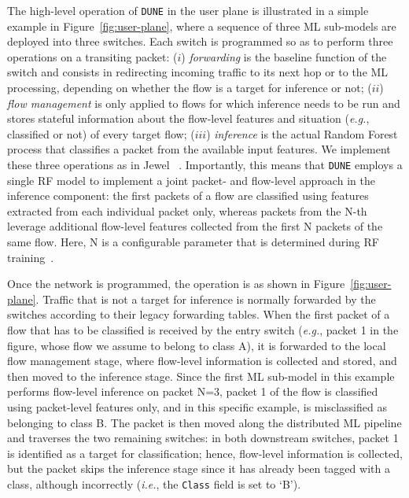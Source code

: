 \documentclass[journal]{IEEEtran}
\theoremstyle{plain} %
\newcommand{\eg}{\textit{e.g.},\xspace}
\newcommand{\ie}{\textit{i.e.},\xspace}
\newcommand{\name}{\texttt{\fontsize{9}{11}\selectfont DUNE}\xspace}
\begin{document}
The high-level operation of \name in the user plane is illustrated in a simple example in Figure~\ref{fig:user-plane}, where a sequence of three ML sub-models are deployed into three switches.
Each switch is programmed so as to perform three operations on a transiting packet: ($i$) \textit{forwarding} is the baseline function of the switch and consists in redirecting incoming traffic to its next hop or to the ML processing, depending on whether the flow is a target for inference or not; ($ii$) \textit{flow management} is only applied to flows for which inference needs to be run and stores stateful information about the flow-level features and situation (\eg classified or not) of every target flow;
($iii$) \textit{inference} is the actual Random Forest process that classifies a packet from the available input features.
%
We implement these three operations as in Jewel ~\cite{jewel-infocom24}. Importantly, this means that \name employs a single RF model to implement a joint packet- and flow-level approach in the inference component: the first packets of a flow are classified using features extracted from each individual packet only, whereas packets from the N-th leverage additional flow-level features collected from the first N packets of the same flow. Here, N is a configurable parameter that is determined during RF training~\cite{jewel-infocom24}.

Once the network is programmed, the operation is as shown in Figure~\ref{fig:user-plane}. Traffic that is not a target for inference is normally forwarded by the switches according to their legacy forwarding tables. When the first packet of a flow that has to be classified is received by the entry switch (\eg packet 1 in the figure, whose flow we assume to belong to class A), it is forwarded to the local flow management stage, where flow-level information is collected and stored, and then moved to the inference stage. Since the first ML sub-model in this example performs flow-level inference on packet N=3, packet 1 of the flow is classified using packet-level features only, and in this specific example, is misclassified as belonging to class B. The packet is then moved along the distributed ML pipeline and traverses the two remaining switches: in both downstream switches, packet 1 is identified as a target for classification; hence, flow-level information is collected, but the packet skips the inference stage since it has already been tagged with a class, although incorrectly (\ie the \texttt{Class} field is set to `B').
\end{document}
